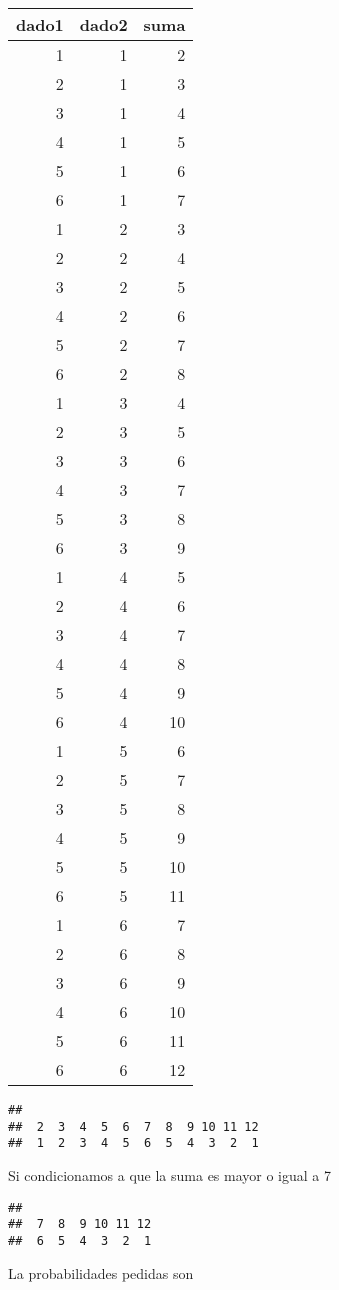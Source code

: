 \documentclass[
]{article}
\newenvironment{Shaded}{\begin{snugshade}}{\end{snugshade}}
\newcommand{\DecValTok}[1]{\textcolor[rgb]{0.00,0.00,0.81}{#1}}
\newcommand{\KeywordTok}[1]{\textcolor[rgb]{0.13,0.29,0.53}{\textbf{#1}}}
\newcommand{\NormalTok}[1]{#1}
\newcommand{\OperatorTok}[1]{\textcolor[rgb]{0.81,0.36,0.00}{\textbf{#1}}}
\begin{document}
\begin{longtable}[]{@{}rrr@{}}
\toprule
dado1 & dado2 & suma\tabularnewline
\midrule
\endhead
1 & 1 & 2\tabularnewline
2 & 1 & 3\tabularnewline
3 & 1 & 4\tabularnewline
4 & 1 & 5\tabularnewline
5 & 1 & 6\tabularnewline
6 & 1 & 7\tabularnewline
1 & 2 & 3\tabularnewline
2 & 2 & 4\tabularnewline
3 & 2 & 5\tabularnewline
4 & 2 & 6\tabularnewline
5 & 2 & 7\tabularnewline
6 & 2 & 8\tabularnewline
1 & 3 & 4\tabularnewline
2 & 3 & 5\tabularnewline
3 & 3 & 6\tabularnewline
4 & 3 & 7\tabularnewline
5 & 3 & 8\tabularnewline
6 & 3 & 9\tabularnewline
1 & 4 & 5\tabularnewline
2 & 4 & 6\tabularnewline
3 & 4 & 7\tabularnewline
4 & 4 & 8\tabularnewline
5 & 4 & 9\tabularnewline
6 & 4 & 10\tabularnewline
1 & 5 & 6\tabularnewline
2 & 5 & 7\tabularnewline
3 & 5 & 8\tabularnewline
4 & 5 & 9\tabularnewline
5 & 5 & 10\tabularnewline
6 & 5 & 11\tabularnewline
1 & 6 & 7\tabularnewline
2 & 6 & 8\tabularnewline
3 & 6 & 9\tabularnewline
4 & 6 & 10\tabularnewline
5 & 6 & 11\tabularnewline
6 & 6 & 12\tabularnewline
\bottomrule
\end{longtable}

\begin{Shaded}
\end{Shaded}

\begin{verbatim}
## 
##  2  3  4  5  6  7  8  9 10 11 12 
##  1  2  3  4  5  6  5  4  3  2  1
\end{verbatim}

Si condicionamos a que la suma es mayor o igual a 7

\begin{Shaded}
\end{Shaded}

\begin{verbatim}
## 
##  7  8  9 10 11 12 
##  6  5  4  3  2  1
\end{verbatim}

La probabilidades pedidas son

\begin{Shaded}
\end{Shaded}
\end{document}
